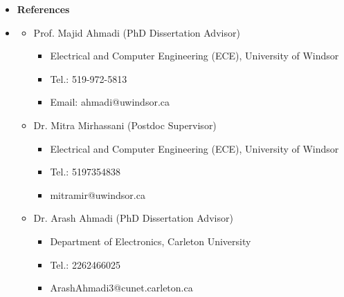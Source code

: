 \begin {itemize}
    \item [] {\bf \Large    References }  \vspace{-1.5em}
    \item []  {\bf \hrulefill } \mdseries \normalsize 
    \begin {itemize}
        \item [-] Prof. Majid Ahmadi (PhD Dissertation Advisor)   
        \begin {itemize}
            \item [] Electrical and Computer Engineering (ECE), University of Windsor
            \item [] Tel.: 519-972-5813
            \item [] Email: ahmadi@uwindsor.ca
        \end {itemize}
          \item [-]    Dr. Mitra Mirhassani (Postdoc Supervisor)
                \begin {itemize}
                  \item [-] Electrical and Computer Engineering (ECE), University of Windsor
                    \item [-] Tel.: 5197354838
                    \item []  mitramir@uwindsor.ca
                \end {itemize}
         \item [-]    Dr. Arash Ahmadi (PhD Dissertation Advisor) 
            \begin {itemize}
            \item [-] Department of Electronics, Carleton University
                \item [-] Tel.: 2262466025
                \item [] ArashAhmadi3@cunet.carleton.ca
            \end {itemize}

    \end {itemize}
\end {itemize}












